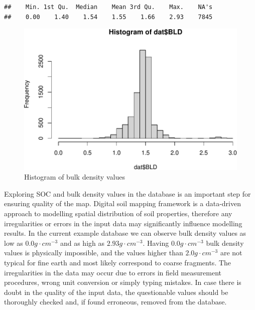 \documentclass[10pt,b5paper,]{book}
\newenvironment{Shaded}{\begin{snugshade}}{\end{snugshade}}
\newcommand{\CommentTok}[1]{\textcolor[rgb]{0.56,0.35,0.01}{\textit{#1}}}
\newcommand{\DataTypeTok}[1]{\textcolor[rgb]{0.13,0.29,0.53}{#1}}
\newcommand{\DecValTok}[1]{\textcolor[rgb]{0.00,0.00,0.81}{#1}}
\newcommand{\KeywordTok}[1]{\textcolor[rgb]{0.13,0.29,0.53}{\textbf{#1}}}
\newcommand{\NormalTok}[1]{#1}
\newcommand{\OperatorTok}[1]{\textcolor[rgb]{0.81,0.36,0.00}{\textbf{#1}}}
\newcommand{\StringTok}[1]{\textcolor[rgb]{0.31,0.60,0.02}{#1}}
\theoremstyle{definition}
\theoremstyle{definition}
\theoremstyle{definition}
\theoremstyle{remark}
\begin{document}
\begin{Shaded}
\end{Shaded}

\begin{verbatim}
##    Min. 1st Qu.  Median    Mean 3rd Qu.    Max.    NA's 
##    0.00    1.40    1.54    1.55    1.66    2.93    7845
\end{verbatim}

\begin{Shaded}
\end{Shaded}

\begin{figure}
\centering
\includegraphics{SOCMapping_files/figure-latex/unnamed-chunk-12-1.pdf}
\caption{\label{fig:unnamed-chunk-12}Histogram of bulk density values}
\end{figure}

Exploring SOC and bulk density values in the database is an important
step for ensuring quality of the map. Digital soil mapping framework is
a data-driven approach to modelling spatial distribution of soil
properties, therefore any irregularities or errors in the input data may
significantly influence modelling results. In the current example
database we can observe bulk density values as low as
\(0.0 g \cdot cm^{-3}\) and as high as \(2.93 g \cdot cm^{-3}\). Having
\(0.0 g \cdot cm^{-3}\) bulk density values is physically impossible,
and the values higher than \(2.0 g \cdot cm^{-3}\) are not typical for
fine earth \citep{USDA_2018} and most likely correspond to coarse
fragments. The irregularities in the data may occur due to errors in
field measurement procedures, wrong unit conversion or simply typing
mistakes. In case there is doubt in the quality of the input data, the
questionable values should be thoroughly checked and, if found
erroneous, removed from the database.
\end{document}
